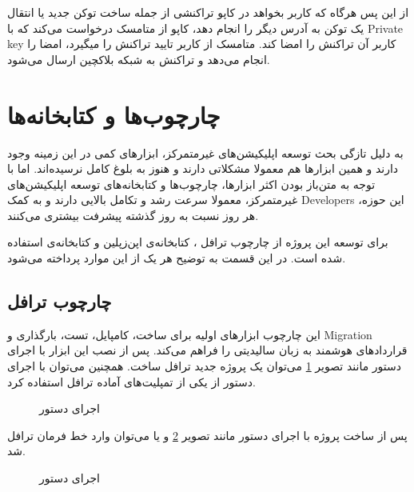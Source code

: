 از این پس هرگاه که کاربر بخواهد در کاپو تراکنشی از جمله
ساخت توکن جدید یا انتقال یک توکن به آدرس دیگر را انجام دهد،
کاپو از متامسک درخواست می‌کند که با
\gls{Private key}
کاربر آن تراکنش را امضا کند.
متامسک از کاربر تایید تراکنش را میگیرد، امضا را انجام می‌دهد و تراکنش به شبکه بلاکچین ارسال می‌شود.


\section{چارچوب‌ها و کتابخانه‌ها}
به دلیل تازگی بحث توسعه اپلیکیشن‌های غیرمتمرکز،
ابزارهای کمی در این زمینه وجود دارند
و همین ابزارها هم معمولا مشکلاتی دارند و هنوز به بلوغ کامل نرسیده‌اند.
اما با توجه به متن‌باز بودن اکثر ابزارها، چارچوب‌ها و کتابخانه‌های توسعه اپلیکیشن‌های غیرمتمرکز،
معمولا سرعت رشد و تکامل بالایی دارند و به کمک
\glspl{Developer}
این حوزه، هر روز نسبت به روز گذشته پیشرفت بیشتری می‌کنند.

برای توسعه این پروژه از
چارچوب ترافل
،
کتابخانه‌ی اپن‌زپلین
و کتابخانه‌ی
استفاده شده است. در این قسمت به توضیح هر یک از این موارد پرداخته می‌شود.

\subsection{چارچوب ترافل}
این چارچوب ابزارهای اولیه برای ساخت، کامپایل، تست، بارگذاری و
\gls{Migration}
قراردادهای هوشمند به زبان سالیدیتی را فراهم می‌کند.
پس از نصب این ابزار با اجرای دستور
مانند تصویر 
\ref{fig:truffle-init}
می‌توان یک پروژه جدید ترافل ساخت.
همچنین می‌توان با اجرای دستور
از یکی از تمپلیت‌های آماده ترافل استفاده کرد.

\begin{figure}[H]
\centerline{}
\caption{اجرای دستور }
\label{fig:truffle-init}
\end{figure}

پس از ساخت پروژه با اجرای دستور
مانند تصویر
\ref{fig:truffle-develop}
و یا
 می‌توان وارد خط فرمان ترافل شد.

\begin{figure}[H]
\centerline{}
\caption{اجرای دستور }
\label{fig:truffle-develop}
\end{figure}

